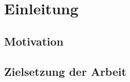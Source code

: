 \chapter{Einleitung} \label{cha:einleitung}

\section{Motivation} \label{sec:motivation}
\lipsum[1-5]

\section{Zielsetzung der Arbeit} \label{sec:aufgabenstellung}
\lipsum[1-3]